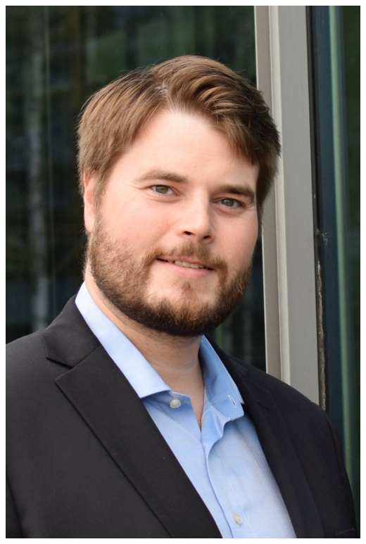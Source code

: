 \documentclass{article}
\begin{document}
\begin{minipage}{.22\textwidth}

\includegraphics[width=\textwidth]{cv_profile}

\end{minipage}%

\vspace{1cm}
\end{document}
